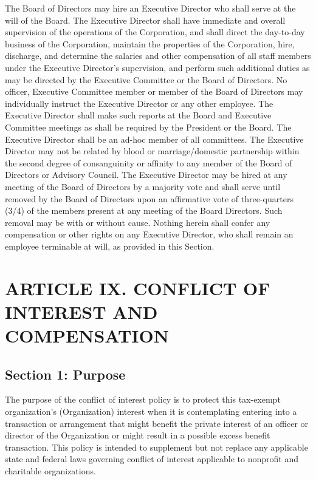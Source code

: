 \documentclass[a4paper]{article}
\begin{document}
The Board of Directors may hire an Executive Director who shall serve at the will of the Board.  The Executive Director shall have immediate and overall supervision of the operations of the Corporation, and shall direct the day-to-day business of the Corporation, maintain the properties of the Corporation, hire, discharge, and determine the salaries and other compensation of all staff members under the Executive Director's supervision, and perform such additional duties as may be directed by the Executive Committee or the Board of Directors.  No officer, Executive Committee member or member of the Board of Directors may individually instruct the Executive Director or any other employee.  The Executive Director shall make such reports at the Board and Executive Committee meetings as shall be required by the President or the Board.  The Executive Director shall be an ad-hoc member of all committees.
The Executive Director may not be related by blood or marriage/domestic partnership within the second degree of consanguinity or affinity to any member of the Board of Directors or Advisory Council.  The Executive Director may be hired at any meeting of the Board of Directors by a majority vote and shall serve until removed by the Board of Directors upon an affirmative vote of three-quarters (3/4) of the members present at any meeting of the Board Directors.  Such removal may be with or without cause.  Nothing herein shall confer any compensation or other rights on any Executive Director, who shall remain an employee terminable at will, as provided in this Section.

\section*{ARTICLE IX. CONFLICT OF INTEREST AND COMPENSATION}


\subsection*{Section 1: Purpose}

The purpose of the conflict of interest policy is to protect this tax-exempt organization's (Organization) interest when it is contemplating entering into a transaction or arrangement that might benefit the private interest of an officer or director of the Organization or might result in a possible excess benefit transaction. This policy is intended to supplement but not replace any applicable state and federal laws governing conflict of interest applicable to nonprofit and charitable organizations.
\end{document}
